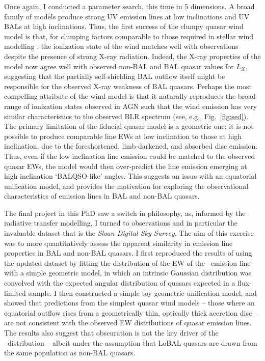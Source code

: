 Once again, I conducted a parameter search, this time in 5 dimensions. 
A broad family of models produce strong UV emission lines at low inclinations
and UV BALs at high inclinations. 
Thus, the first success of the clumpy quasar wind model is that,
for clumping factors comparable to those required 
in stellar wind modelling \citep{hamann2008}, the ionization
state of the wind matches well with observations despite the presence
of strong X-ray radiation. Indeed, the X-ray properties of the model now 
agree well with observed non-BAL and BAL quasar values for $L_X$, suggesting
that the partially self-shielding BAL outflow itself might be responsible 
for the observed X-ray weakness of BAL quasars. Perhaps the most
compelling attribute of the wind model is that it naturally reproduces
the broad range of ionization states observed in AGN such that the wind 
emission has very similar characteristics to the observed BLR spectrum 
(see, e.g., Fig.~\ref{fig:sed}). The primary limitation of the fiducial
quasar model is a geometric one; it is not possible to produce comparable
line EWs at low inclination to those at high inclination, due to the
foreshortened, limb-darkened, and absorbed disc emission. Thus, even 
if the low inclination line emission could be matched to the observed quasar EWs,
the model would then over-predict the line emission emerging at high inclination
`BALQSO-like' angles. This suggests an issue with an equatorial unification model,
and provides the motivation for exploring the observational
characteristics of emission lines in BAL and non-BAL quasars.

The final project in this PhD saw a switch in philosophy, as, informed
by the radiative transfer modelling, I turned to observations and in particular
the invaluable dataset that is the {\sl Sloan Digital Sky Survey}. 
The aim of this exercise was to more quantitatively assess the apparent
similarity in emission line properties in BAL and non-BAL quasars. I first
reproduced the results of \cite{risaliti2011} using the updated dataset 
by fitting the distribution of the EW of the \oiiifull\ emission line 
with a simple geometric model, in which an intrinsic Gaussian distribution
was convolved with the expected angular distribution of quasars expected in a 
flux-limited sample. I then constructed a simple toy geometric unification model,
and showed that predictions from the simplest quasar wind models -- 
those where an equatorial outflow rises from a geometrically thin, 
optically thick accretion disc -- are not consistent with the observed 
EW distributions of quasar emission lines. The results also suggest that
obscuration is not the key driver of the \ewo\ distribution -- albeit
under the assumption that LoBAL
quasars are drawn from the same population as non-BAL quasars.

